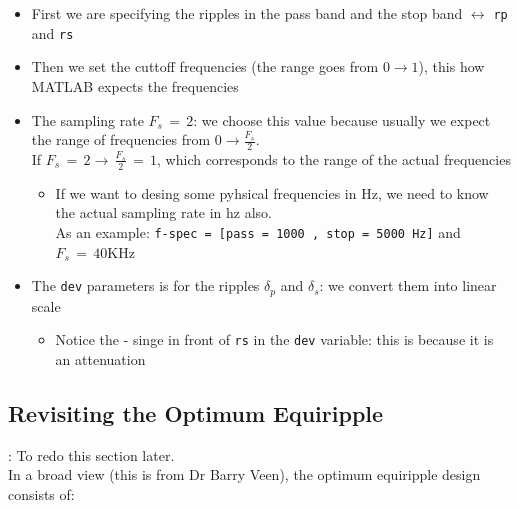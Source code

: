 \documentclass[12pt,a4paper]{book}
\begin{document}
\begin{itemize}

\item First we are specifying the ripples in the pass band and the stop band $\leftrightarrow$ \verb|rp| and  \verb|rs|

\item Then we set the cuttoff frequencies  (the range goes from $0 \rightarrow 1$), this how MATLAB expects the frequencies

\item The sampling rate $F_s \, = \, 2$: we choose this value because usually we expect the range of frequencies from $0 \rightarrow \displaystyle\frac{F_s}{2}$.\\

If $F_s \, = \, 2 \rightarrow \,\displaystyle\frac{F_s}{2} \, = \, 1$, which corresponds to the range of the actual frequencies

    \begin{itemize}
        \item If we want to desing some pyhsical frequencies in Hz, we need to know the actual sampling rate in hz also.\\
        
        As an example: \verb|f-spec = [pass = 1000 , stop = 5000 Hz]| and $F_s \, = \, 40$KHz
    \end{itemize}

\item The \verb|dev| parameters is for the ripples $\delta_p$ and $\delta_s$: we convert them into linear scale

    \begin{itemize}
        \item Notice the - singe in front of \verb|rs| in the \verb|dev| variable: this is because it is an attenuation
    \end{itemize}


\end{itemize}

\subsection{Revisiting the Optimum Equiripple}

: To redo this section later.\\

In a broad view (this is from Dr Barry Veen), the optimum equiripple design consists of:
\end{document}
